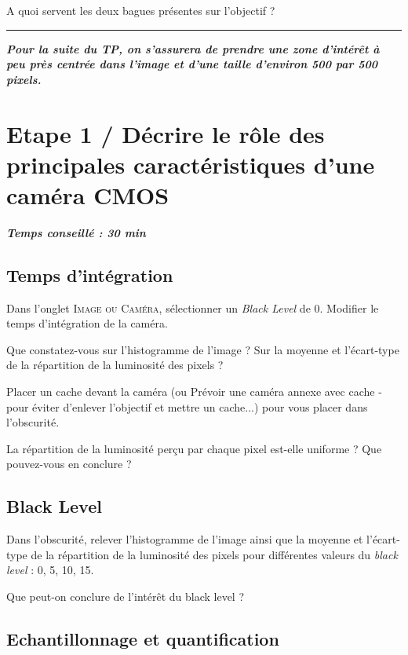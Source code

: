 \documentclass[a4paper,11pt,titlepage]{article} %
\begin{document}
\medskip

\Quest A quoi servent les deux bagues présentes sur l'objectif ?


\noindent \rule{\linewidth}{1pt}

\textit{\textbf{Pour la suite du TP, on s'assurera de prendre une zone d'intérêt à peu près centrée dans l'image et d'une taille d'environ 500 par 500 pixels.}}


\newpage
\section{Etape 1 / Décrire le rôle des principales caractéristiques d'une caméra CMOS}

\begin{center} \textbf{\textit{Temps conseillé : 30 min}} \end{center}


\subsection{Temps d'intégration}

\Manip Dans l'onglet \textsc{Image ou Caméra}, sélectionner un \textit{Black Level} de 0. Modifier le temps d'intégration de la caméra.

\Quest Que constatez-vous sur l'histogramme de l'image ? Sur la moyenne et l'écart-type de la répartition de la luminosité des pixels ?

\Manip Placer un cache devant la caméra (ou Prévoir une caméra annexe avec cache - pour éviter d'enlever l'objectif et mettre un cache...) pour vous placer dans l'obscurité.

\Quest La répartition de la luminosité perçu par chaque pixel est-elle uniforme ? Que pouvez-vous en conclure ?


\subsection{Black Level}

\Manip Dans l'obscurité, relever l'histogramme de l'image ainsi que la moyenne et l'écart-type de la répartition de la luminosité des pixels pour différentes valeurs du \textit{black level} : 0, 5, 10, 15.

\Quest Que peut-on conclure de l'intérêt du black level ?

\subsection{Echantillonnage et quantification}
\end{document}
